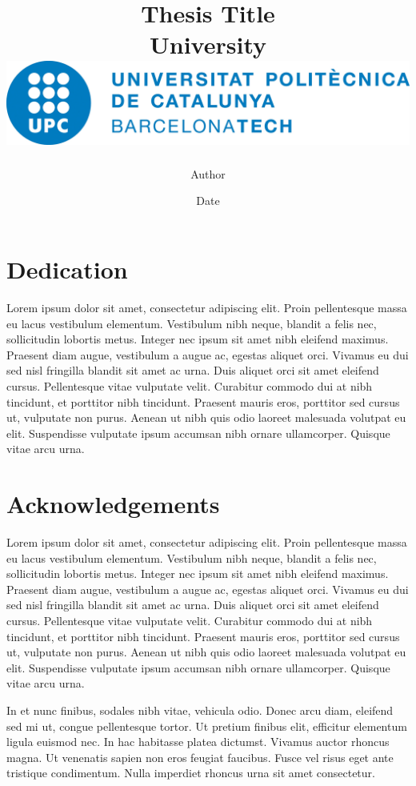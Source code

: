 \documentclass[12pt,twoside]{report}
\title{{Thesis Title}\\
	{\large University}\\
	{\label{img:logo_UPC}
	\includegraphics[scale=0.5]{logo_UPC.jpg}}
}
\author{Author}
\date{Date}
\begin{document}

\clearpage\pagestyle{empty}\mbox{}\clearpage


\chapter*{Dedication}
Lorem ipsum dolor sit amet, consectetur adipiscing elit. Proin pellentesque massa eu lacus vestibulum elementum. Vestibulum nibh neque, blandit a felis nec, sollicitudin lobortis metus. Integer nec ipsum sit amet nibh eleifend maximus. Praesent diam augue, vestibulum a augue ac, egestas aliquet orci. Vivamus eu dui sed nisl fringilla blandit sit amet ac urna. Duis aliquet orci sit amet eleifend cursus. Pellentesque vitae vulputate velit. Curabitur commodo dui at nibh tincidunt, et porttitor nibh tincidunt. Praesent mauris eros, porttitor sed cursus ut, vulputate non purus. Aenean ut nibh quis odio laoreet malesuada volutpat eu elit. Suspendisse vulputate ipsum accumsan nibh ornare ullamcorper. Quisque vitae arcu urna.

\chapter*{Acknowledgements}
Lorem ipsum dolor sit amet, consectetur adipiscing elit. Proin pellentesque massa eu lacus vestibulum elementum. Vestibulum nibh neque, blandit a felis nec, sollicitudin lobortis metus. Integer nec ipsum sit amet nibh eleifend maximus. Praesent diam augue, vestibulum a augue ac, egestas aliquet orci. Vivamus eu dui sed nisl fringilla blandit sit amet ac urna. Duis aliquet orci sit amet eleifend cursus. Pellentesque vitae vulputate velit. Curabitur commodo dui at nibh tincidunt, et porttitor nibh tincidunt. Praesent mauris eros, porttitor sed cursus ut, vulputate non purus. Aenean ut nibh quis odio laoreet malesuada volutpat eu elit. Suspendisse vulputate ipsum accumsan nibh ornare ullamcorper. Quisque vitae arcu urna.\par

In et nunc finibus, sodales nibh vitae, vehicula odio. Donec arcu diam, eleifend sed mi ut, congue pellentesque tortor. Ut pretium finibus elit, efficitur elementum ligula euismod nec. In hac habitasse platea dictumst. Vivamus auctor rhoncus magna. Ut venenatis sapien non eros feugiat faucibus. Fusce vel risus eget ante tristique condimentum. Nulla imperdiet rhoncus urna sit amet consectetur.\par
\end{document}
